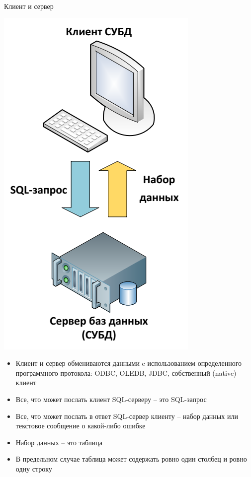 \documentclass{beamer}
\begin{document}
\begin{frame}{Клиент и сервер}
	\begin{minipage}{0.3\textwidth}
		\begin{flushleft}
			\begin{center}
				\includegraphics[scale=0.3]{images/Server.png}
			\end{center}
		\end{flushleft}
	\end{minipage}
	\begin{minipage}{0.6\textwidth}
		\begin{flushright}
			\begin{itemize}
				\item Клиент и сервер обмениваются данными c использованием определенного программного протокола: ODBC, OLEDB, JDBC, собственный (native) клиент
				\item Все, что может послать клиент SQL-серверу – это SQL-запрос
				\item Все, что может послать в ответ SQL-сервер клиенту – набор данных или текстовое сообщение о какой-либо ошибке
				\item Набор данных – это таблица 
				\item В предельном случае таблица может содержать ровно один столбец и ровно одну строку 						\end{itemize}
		\end{flushright}
	\end{minipage}
\end{frame}
\end{document}
